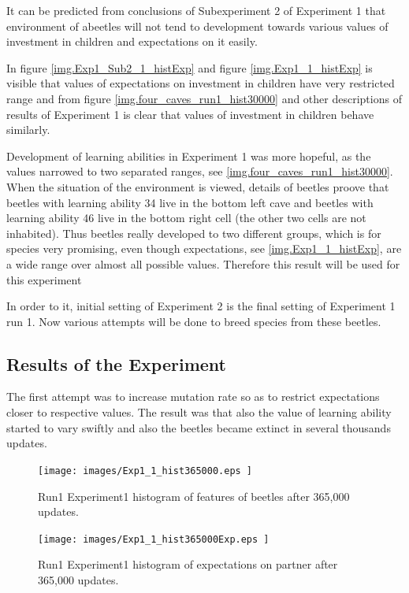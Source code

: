 \documentclass[a4paper,12pt]{report}
\begin{document}
It can be predicted from conclusions of Subexperiment 2 of Experiment 1 that environment of abeetles will not tend to development towards various values of investment in children and expectations on it easily. 

In figure \ref{img.Exp1_Sub2_1_histExp} and figure \ref{img.Exp1_1_histExp} is visible that values of expectations on investment in children have very restricted range and from figure \ref{img.four_caves_run1_hist30000} and other descriptions of results of Experiment 1 is clear that values of investment in children behave similarly.

Development of learning abilities in Experiment 1 was more hopeful, as the values narrowed to two separated ranges, see \ref{img.four_caves_run1_hist30000}. When the situation of the environment is viewed, details of beetles proove that beetles with learning ability 34 live in the bottom left cave and beetles with learning ability 46 live in the bottom right cell (the other two cells are not inhabited). Thus beetles really developed to two different groups, which is for species very promising, even though expectations, see \ref{img.Exp1_1_histExp}, are a wide range over almost all possible values. Therefore this result will be used for this experiment 

In order to it, initial setting of Experiment 2 is the final setting of Experiment 1 run 1. Now various attempts will be done to breed species from these beetles.

\subsection{Results of the Experiment}

The first attempt was to increase mutation rate so as to restrict expectations closer to respective values. The result was that also the value of learning ability started to vary swiftly and also the beetles became extinct in several thousands updates.
 


\begin{figure}
\begin{center}
  \texttt{[image: images/Exp1\_1\_hist365000.eps ]}
  \caption{Run1 Experiment1 histogram of features of beetles after 365,000 updates.}
  \label{img.Exp1_1_hist365000}
\end{center}
\end{figure}

\begin{figure}
\begin{center}
  \texttt{[image: images/Exp1\_1\_hist365000Exp.eps ]}
  \caption{Run1 Experiment1 histogram of expectations on partner after 365,000 updates.}
  \label{img.Exp1_1_hist365000Exp}
\end{center}
\end{figure}
\end{document}
